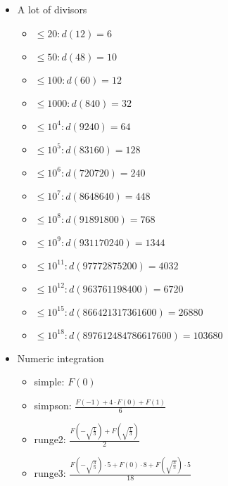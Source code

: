 \begin{itemize}
	\item A lot of divisors
	\begin{itemize}
		\item $\leq 20: d(12)=6$
		\item $\leq 50: d(48)=10$
		\item $\leq 100: d(60)=12$
		\item $\leq 1000: d(840)=32$
		\item $\leq 10^4: d(9240)=64$
		\item $\leq 10^5: d(83160)=128$
		\item $\leq 10^6: d(720720)=240$
		\item $\leq 10^7: d(8648640)=448$
		\item $\leq 10^8: d(91891800)=768$
		\item $\leq 10^9: d(931170240)=1344$
		\item $\leq 10^{11}: d(97772875200)=4032$
		\item $\leq 10^{12}: d(963761198400)=6720$
		\item $\leq 10^{15}: d(866421317361600)=26880$
		\item $\leq 10^{18}: d(897612484786617600)=103680$
	\end{itemize}

	\item Numeric integration
	\begin{itemize}
		\item simple: $F(0)$
		\item simpson: $\frac{F(-1) + 4 \cdot F(0) + F(1)}{6}$
		\item runge2: $\frac{ F(-\sqrt{\frac{1}{3}}) + F(\sqrt{\frac{1}{3}}) }{2}$
		\item runge3: $\frac{ F(-\sqrt{\frac{3}{5}}) \cdot 5 + F(0) \cdot 8 +  F(\sqrt{\frac{3}{5}}) \cdot 5}{18}$
	\end{itemize}
\end{itemize}	

